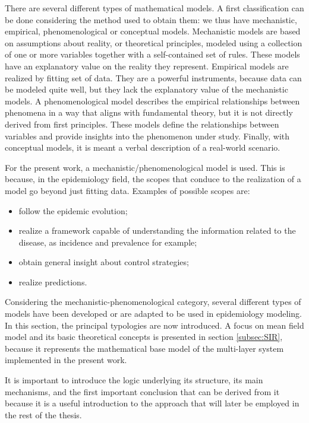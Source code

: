 There are several different types of mathematical models.
A first classification can be done considering the method used to obtain them: we thus have mechanistic, empirical, phenomenological or conceptual models.
Mechanistic models are based on assumptions about reality, or theoretical principles, modeled using a collection of one or more variables together with a self-contained set of rules. These models have an explanatory value on the reality they represent.
Empirical models are realized by fitting set of data. They are a powerful instruments, because data can be modeled quite well, but they lack the explanatory value of the mechanistic models.
A phenomenological model describes the empirical relationships between phenomena in a way that aligns with fundamental theory, but it is not directly derived from first principles. These models define the relationships between variables and provide insights into the phenomenon under study. 
Finally, with conceptual models, it is meant a verbal description of a real-world scenario. 

For the present work, a mechanistic/phenomenological model is used. This is because, in the epidemiology field, the scopes that conduce to the realization of a model go beyond just fitting data. Examples of possible scopes are:
\begin{itemize}
	\item follow the epidemic evolution;
	\item realize a framework capable of understanding the information related to the disease, as incidence and prevalence for example;
	\item obtain general insight about control strategies;
	\item realize predictions.
\end{itemize}
Considering the mechanistic-phenomenological category, several different types of models have been developed or are adapted to be used in epidemiology modeling. In this section, the principal typologies are now introduced. 
A focus on mean field model and its basic theoretical concepts is presented in section \ref{subsec:SIR}, because it represents the mathematical base model of the multi-layer system implemented in the present work. 

It is important to introduce the logic underlying its structure, its main mechanisms, and the first important conclusion that can be derived from it because it is a useful introduction to the approach that will later be employed in the rest of the thesis.

